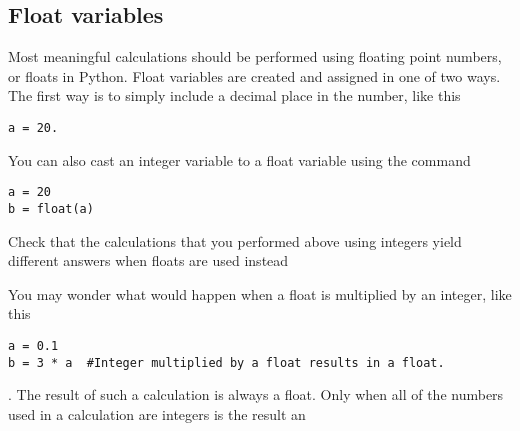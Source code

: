 \subsection*{Float variables}
Most meaningful calculations should be performed using floating point
numbers, or floats in Python.  Float variables are created and assigned in
one of two ways.  The first way is to simply include a decimal place
in the number, like this
\begin{Verbatim}
a = 20.
\end{Verbatim}
You can also cast an integer variable to a float variable using the
 command
\begin{Verbatim}
a = 20
b = float(a)
\end{Verbatim}
\begin{enumerate}
\prob Check that the calculations that you performed above using integers
yield different answers when floats are used instead
\end{enumerate}
You may wonder what would happen when a float is multiplied by an
integer, like this
\begin{Verbatim}
a = 0.1
b = 3 * a  #Integer multiplied by a float results in a float.
\end{Verbatim}
 .  The result of such a calculation is always a float.  Only when
all of the numbers used in a calculation are integers is the result an
